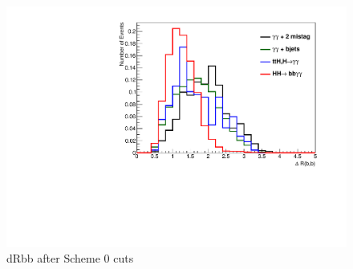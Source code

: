 \documentclass{cmspaper}
\begin{document}
\begin{figure}
\centering
\includegraphics[scale=0.45, angle=0]{figures/dRbb_s0_normalized.pdf}	
\caption{dRbb after Scheme 0 cuts}
\label{fig:dRbb_s0}
\end{figure}
\end{document}
